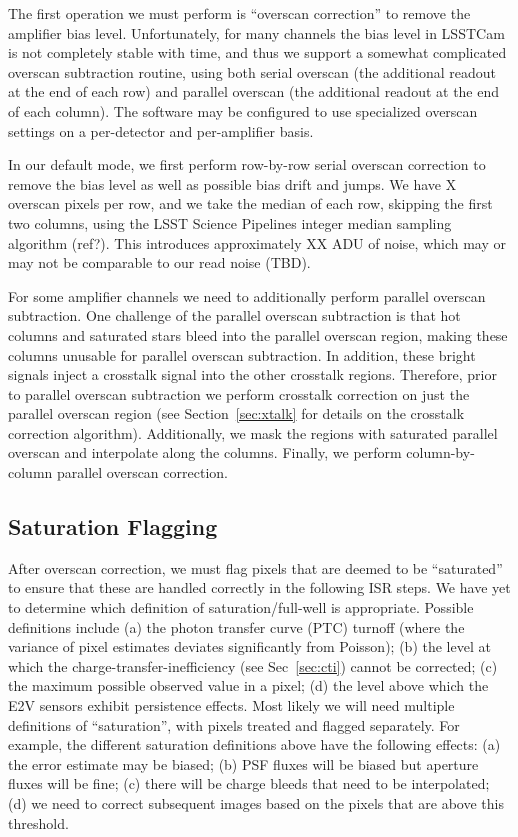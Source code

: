 \documentclass[SE,authoryear,lsstdraft,toc]{lsstdoc}
\begin{document}
The first operation we must perform is ``overscan correction'' to remove the
amplifier bias level.  Unfortunately, for many channels the bias level in
LSSTCam is not completely stable with time, and thus we support a somewhat
complicated overscan subtraction routine, using both serial overscan (the
additional readout at the end of each row) and parallel overscan (the
additional readout at the end of each column).  The software may be configured
to use specialized overscan settings on a per-detector and per-amplifier basis.

In our default mode, we first perform row-by-row serial overscan correction to
remove the bias level as well as possible bias drift and jumps.  We have X
overscan pixels per row, and we take the median of each row, skipping the first
two columns, using the LSST Science Pipelines integer median sampling algorithm
(ref?).  This introduces approximately XX ADU of noise, which may or may not be
comparable to our read noise (TBD).

For some amplifier channels we need to additionally perform parallel overscan
subtraction.  One challenge of the parallel overscan subtraction is that hot
columns and saturated stars bleed into the parallel overscan region, making
these columns unusable for parallel overscan subtraction.  In addition, these
bright signals inject a crosstalk signal into the other crosstalk regions.
Therefore, prior to parallel overscan subtraction we perform crosstalk
correction on just the parallel overscan region (see Section~\ref{sec:xtalk}
for details on the crosstalk correction algorithm).  Additionally, we mask the
regions with saturated parallel overscan and interpolate along the columns.
Finally, we perform column-by-column parallel overscan correction.

\subsection{Saturation Flagging}

After overscan correction, we must flag pixels that are deemed to be
``saturated'' to ensure that these are handled correctly in the following ISR
steps.  We have yet to determine which definition of saturation/full-well is
appropriate.  Possible definitions include (a) the photon transfer curve (PTC)
turnoff (where the variance of pixel estimates deviates significantly from
Poisson); (b) the level at which the charge-transfer-inefficiency (see
Sec~\ref{sec:cti}) cannot be corrected; (c) the maximum possible observed value
in a pixel; (d) the level above which the E2V sensors exhibit persistence
effects. Most likely we will need multiple definitions of ``saturation'', with
pixels treated and flagged separately. For example, the different saturation
definitions above have the following effects: (a) the error estimate may be
biased; (b) PSF fluxes will be biased but aperture fluxes will be fine; (c)
there will be charge bleeds that need to be interpolated; (d) we need to
correct subsequent images based on the pixels that are above this threshold.
\end{document}
